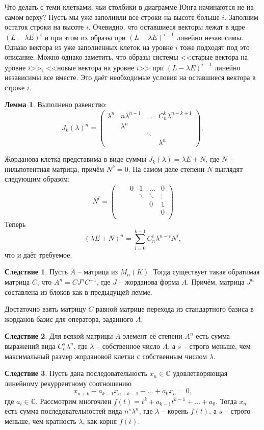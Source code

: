 \documentclass[10pt,a4paper,oneside]{book}
\theoremstyle{definition}
\newtheorem{lem}{\color{green!50!black}Лемма}
\newtheorem{cor}{\color{green!45!black}Следствие}
\newcommand{\mb}[1]{\mathbb{#1}}
\def\lm{\begin{lem}}
\def\elm{\end{lem}}
\def\crl{\begin{cor}}
\def\ecrl{\end{cor}}
\def\pmat{\begin{pmatrix}}
\def\epmat{\end{pmatrix}}
\begin{document}
Что делать с теми клетками, чьи столбики в диаграмме Юнга начинаются не на самом верху? Пусть мы уже заполнили все строки на высоте больше $i$. Заполним остаток строки на высоте $i$.  Очевидно, что оставшиеся векторы лежат в ядре $(L-\lambda E)^{i}$ и при этом их образы при $(L-\lambda E)^{i-1}$ линейно независимы. Однако вектора из уже заполненных клеток на уровне $i$ тоже подходят под это описание. Можно однако заметить, что образы системы <<старые вектора на уровне $i$>>, <<новые вектора на уровне $i$>> при $(L-\lambda E)^{i-1}$ линейно независимы все вместе. Это даёт необходимые условия на оставшиеся вектора в строке $i$.

\lm Выполнено равенство:
$$J_k(\lambda)^n= \pmat \lambda^n & n\lambda^{n-1} & \dots & C_n^k\lambda^{n-k+1}\\
 &  \lambda^n & &\\
 &            & \ddots & \\
 &&&  \lambda^n \epmat,$$
\elm
\proof Жорданова клетка представима в виде суммы $J_k(\lambda)= \lambda E + N$, где $N$ -- нильпотентная матрица, причём $N^k=0$. На самом деле степени $N$ выглядят следующим образом:
$$N^l= \pmat  & &0& 1& \dots &0 \\
   & && \ddots &\ddots& \vdots\\
 &&&&0& 1\\
 &&&&& 0 \\
 &&&&&  \epmat $$
Теперь
$$(\lambda E+N)^n= \sum_{i=0}^{k-1} C_n^i\lambda^{n-i}N^i,$$
что и даёт требуемое.
\endproof

\crl Пусть $A$ -- матрица из $M_n(K)$. Тогда существует такая обратимая матрица $C$, что $A^n=CJ^nC^{-1}$, где $J$ -- жорданова форма $A$. Причём, матрица $J^n$ составлена из блоков как в предыдущей лемме.
\ecrl
\proof Достаточно взять матрицу $C$ равной матрице перехода из стандартного базиса в жорданов базис для оператора, заданного $A$.
\endproof

\crl Для всякой матрицы $A$ элемент её степени $A^n$ есть сумма выражений вида $C_n^s\lambda^n$, где $\lambda$ -- собственное число $A$, а $s$ -- строго меньше, чем максимальный размер жордановой клетки с собственным числом $\lambda$.
\ecrl



\crl Пусть дана последовательность $x_n\in \mb C$ удовлетворяющая линейному рекуррентному соотношению 
$$x_{n+k}+a_{k-1}x_{n+k-1}+\dots+a_0x_n=0,$$
где $a_i \in \mb C$. Рассмотрим многочлен $f(t)=t^k+a_{k-1}t^{k-1}+\dots+a_0$. Тогда $x_n$ есть сумма последовательностей вида $n^s\lambda^n$, где $\lambda$ -- корень $f(t)$, а $s$ -- строго меньше, чем кратность $\lambda$, как корня $f(t)$.
\ecrl
\end{document}
